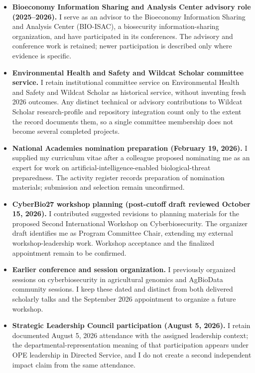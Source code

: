\begin{itemize}
\item \textbf{Bioeconomy Information Sharing and Analysis Center advisory role (2025--2026).} I serve as an advisor to the Bioeconomy Information Sharing and Analysis Center (BIO-ISAC), a biosecurity information-sharing organization, and have participated in its conferences. The advisory and conference work is retained; newer participation is described only where evidence is specific.
\item \textbf{Environmental Health and Safety and Wildcat Scholar committee service.} I retain institutional committee service on Environmental Health and Safety and Wildcat Scholar as historical service, without inventing fresh 2026 outcomes. Any distinct technical or advisory contributions to Wildcat Scholar research-profile and repository integration count only to the extent the record documents them, so a single committee membership does not become several completed projects.
\item \textbf{National Academies nomination preparation (February 19, 2026).} I supplied my curriculum vitae after a colleague proposed nominating me as an expert for work on artificial-intelligence-enabled biological-threat preparedness. The activity register records preparation of nomination materials; submission and selection remain unconfirmed.
\item \textbf{CyberBio27 workshop planning (post-cutoff draft reviewed October 15, 2026).}\label{update-cyberbio} I contributed suggested revisions to planning materials for the proposed Second International Workshop on Cyberbiosecurity. The organizer draft identifies me as Program Committee Chair, extending my external workshop-leadership work. Workshop acceptance and the finalized appointment remain to be confirmed.
\item \textbf{Earlier conference and session organization.} I previously organized sessions on cyberbiosecurity in agricultural genomics and AgBioData community sessions. I keep these dated and distinct from both delivered scholarly talks and the September 2026 appointment to organize a future workshop.
\item \textbf{Strategic Leadership Council participation (August 5, 2026).} I retain documented August 5, 2026 attendance with the assigned leadership context; the departmental-representation meaning of that participation appears under OPE leadership in Directed Service, and I do not create a second independent impact claim from the same attendance.
\end{itemize}

